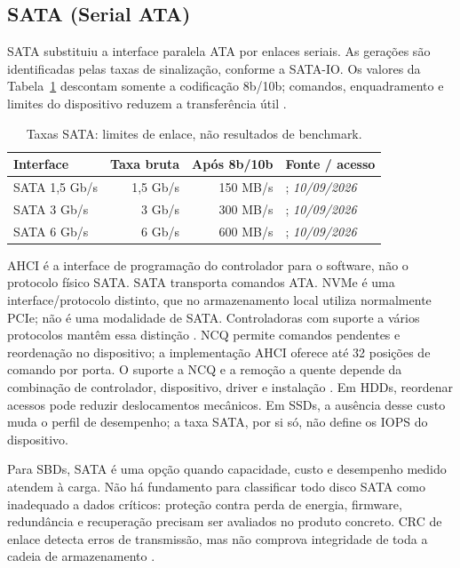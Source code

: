 \documentclass[titlepage]{article}
\newcommand{\acesso}{\textit{10/09/2026}}
\begin{document}
\subsection{SATA (Serial ATA)}
SATA substituiu a interface paralela ATA por enlaces seriais. As gerações são identificadas pelas taxas de sinalização, conforme a SATA-IO. Os valores da Tabela~\ref{tab:sata_geracoes} descontam somente a codificação 8b/10b; comandos, enquadramento e limites do dispositivo reduzem a transferência útil \cite{sata_io_naming,sata_esata}.
\begin{table}[htbp]
\centering\small
\begin{tabularx}{\textwidth}{lrrX}
\toprule
Interface & Taxa bruta & Após 8b/10b & Fonte / acesso \\
\midrule
SATA 1,5 Gb/s & 1,5 Gb/s & 150 MB/s & \cite{sata_io_naming,sata_esata}; \acesso \\
SATA 3 Gb/s & 3 Gb/s & 300 MB/s & \cite{sata_io_naming,sata_esata}; \acesso \\
SATA 6 Gb/s & 6 Gb/s & 600 MB/s & \cite{sata_io_naming}; \acesso \\
\bottomrule
\end{tabularx}
\caption{Taxas SATA: limites de enlace, não resultados de benchmark.}
\label{tab:sata_geracoes}
\end{table}

AHCI é a interface de programação do controlador para o software, não o protocolo físico SATA. SATA transporta comandos ATA. NVMe é uma interface/protocolo distinto, que no armazenamento local utiliza normalmente PCIe; não é uma modalidade de SATA. Controladoras com suporte a vários protocolos mantêm essa distinção \cite{nvme_overview}. NCQ permite comandos pendentes e reordenação no dispositivo; a implementação AHCI oferece até 32 posições de comando por porta. O suporte a NCQ e a remoção a quente depende da combinação de controlador, dispositivo, driver e instalação \cite{intel_ahci}. Em HDDs, reordenar acessos pode reduzir deslocamentos mecânicos. Em SSDs, a ausência desse custo muda o perfil de desempenho; a taxa SATA, por si só, não define os IOPS do dispositivo.

Para SBDs, SATA é uma opção quando capacidade, custo e desempenho medido atendem à carga. Não há fundamento para classificar todo disco SATA como inadequado a dados críticos: proteção contra perda de energia, firmware, redundância e recuperação precisam ser avaliados no produto concreto. CRC de enlace detecta erros de transmissão, mas não comprova integridade de toda a cadeia de armazenamento \cite{snia_dictionary}.
\end{document}

